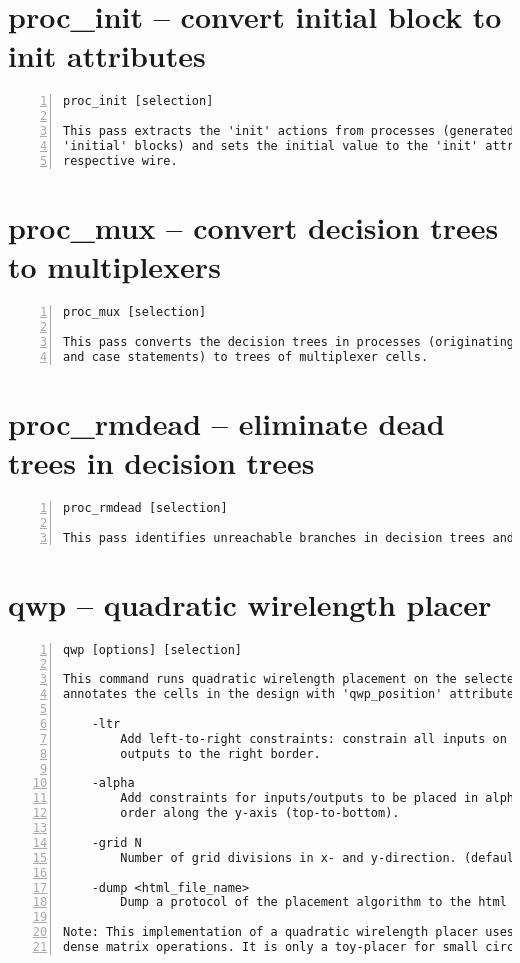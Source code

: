 \section{proc\_init -- convert initial block to init attributes}
\label{cmd:proc_init}
\begin{lstlisting}[numbers=left,frame=single]
    proc_init [selection]

This pass extracts the 'init' actions from processes (generated from Verilog
'initial' blocks) and sets the initial value to the 'init' attribute on the
respective wire.
\end{lstlisting}

\section{proc\_mux -- convert decision trees to multiplexers}
\label{cmd:proc_mux}
\begin{lstlisting}[numbers=left,frame=single]
    proc_mux [selection]

This pass converts the decision trees in processes (originating from if-else
and case statements) to trees of multiplexer cells.
\end{lstlisting}

\section{proc\_rmdead -- eliminate dead trees in decision trees}
\label{cmd:proc_rmdead}
\begin{lstlisting}[numbers=left,frame=single]
    proc_rmdead [selection]

This pass identifies unreachable branches in decision trees and removes them.
\end{lstlisting}

\section{qwp -- quadratic wirelength placer}
\label{cmd:qwp}
\begin{lstlisting}[numbers=left,frame=single]
    qwp [options] [selection]

This command runs quadratic wirelength placement on the selected modules and
annotates the cells in the design with 'qwp_position' attributes.

    -ltr
        Add left-to-right constraints: constrain all inputs on the left border
        outputs to the right border.

    -alpha
        Add constraints for inputs/outputs to be placed in alphanumerical
        order along the y-axis (top-to-bottom).

    -grid N
        Number of grid divisions in x- and y-direction. (default=16)

    -dump <html_file_name>
        Dump a protocol of the placement algorithm to the html file.

Note: This implementation of a quadratic wirelength placer uses exact
dense matrix operations. It is only a toy-placer for small circuits.
\end{lstlisting}

